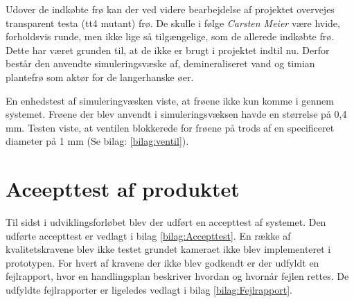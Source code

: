 Udover de indkøbte frø kan der ved videre bearbejdelse af projektet overvejes transparent testa (tt4 mutant) frø. De skulle i følge \textit{Carsten Meier} være hvide, forholdsvis runde, men ikke lige så tilgængelige, som de allerede indkøbte frø. Dette har været grunden til, at de ikke er brugt i projektet indtil nu. Derfor består den anvendte simuleringsvæske af, demineraliseret vand og timian plantefrø som aktør for de langerhanske øer.  

En enhedstest af simuleringvæsken viste, at frøene ikke kun komme i gennem systemet. Frøene der blev anvendt i simuleringsvæksen havde en størrelse på 0,4 mm. Testen viste, at ventilen blokkerede for frøene på trods af en specificeret diameter på 1 mm (Se bilag: \ref{bilag:ventil}). 
 
\section{Aceepttest af produktet} 
Til sidst i udviklingsforløbet blev der udført en accepttest af systemet. Den udførte accepttest er vedlagt i bilag \ref{bilag:Accepttest}. En række af kvalitetskravene blev ikke testet grundet kameraet ikke blev implementeret i prototypen. For hvert af kravene der ikke blev godkendt er der udfyldt en fejlrapport, hvor en handlingsplan beskriver hvordan og hvornår fejlen rettes. De udfyldte fejlrapporter er ligeledes vedlagt i bilag \ref{bilag:Fejlrapport}.

